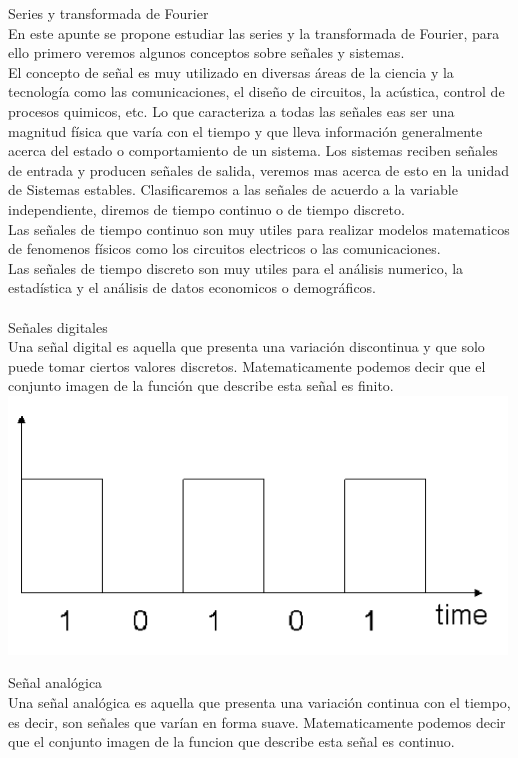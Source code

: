 \documentclass[]{article}
\begin{document}
\Huge Series y transformada de Fourier
\normalsize
\\

En este apunte se propone estudiar las series y la transformada de Fourier, para ello primero veremos algunos conceptos sobre señales y sistemas.
\\
El concepto de señal es muy utilizado en diversas áreas de la ciencia y la tecnología como las comunicaciones, el diseño de circuitos, la acústica, control de procesos quimicos, etc. Lo que caracteriza a todas las señales eas ser una magnitud física que varía con el tiempo y que lleva información generalmente acerca del estado o comportamiento de un sistema. Los sistemas reciben señales de entrada y producen señales de salida, veremos mas acerca de esto en la unidad de Sistemas estables.
Clasificaremos a las señales de acuerdo a la variable independiente, diremos de tiempo continuo o de tiempo discreto.\\
Las señales de tiempo continuo son muy utiles para realizar modelos matematicos de fenomenos físicos como los circuitos electricos o las comunicaciones.\\
Las señales de tiempo discreto son muy utiles para el análisis numerico, la estadística y el análisis de datos economicos o demográficos.\\
\\
\large Señales digitales
\normalsize
\\
Una señal digital es aquella que presenta una variación discontinua y que solo puede tomar ciertos valores discretos. Matematicamente podemos decir que el conjunto imagen de la función que describe esta señal es finito.
\includegraphics{../../../Imagenes/Superior/Fourier/Fourier01.PNG}

\large Señal analógica
\normalsize
\\
Una señal analógica es aquella que presenta una variación	continua con el tiempo, es decir, son señales que varían en forma suave. Matematicamente podemos decir que el conjunto imagen de la funcion que describe esta señal es continuo.
\end{document}

